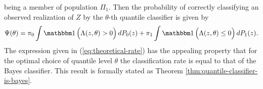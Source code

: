 being a member of population $\Pi_1$.  Then the probability of correctly
classifying an observed realization of $Z$ by the $\theta$-th quantile
classifier is given by
\begin{equation}
  \label{eq:theoretical-rate}
  \Psi(\theta) =
  \pi_0 \int \ind\Big( \Lambda(z, \theta) > 0 \Big)\, dP_0(z) +
  \pi_1 \int \ind\Big(\Lambda(z, \theta) \leq 0 \Big)\, dP_1(z).
\end{equation}
The expression given in (\ref{eq:theoretical-rate}) has the appealing property
that for the optimal choice of quantile level $\theta$ the classification rate
is equal to that of the Bayes classifier.  This result is formally stated as
Theorem \ref{thm:quantile-classifier-is-bayes}.





